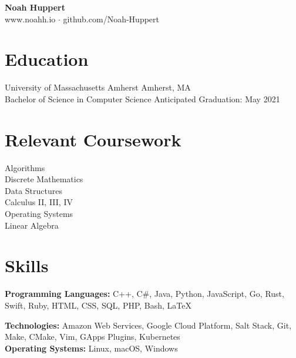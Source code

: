 \documentclass[10pt]{article}
\begin{document}

\centering
	\textbf{Noah Huppert} \\
	
	www.noahh.io $\cdot$ github.com/Noah-Huppert


\begin{flushleft}

\section{Education}
	University of Massachusetts Amherst \hfill Amherst, MA \\
	Bachelor of Science in Computer Science \hfill Anticipated Graduation: May 2021 \\

\section{Relevant Coursework}
	\begin{addmargin}[1em]{1em}
	\begin{multicols}{3}
		Algorithms \\
		Discrete Mathematics \\

		Data Structures \\
		Calculus II, III, IV \\

		Operating Systems \\
		Linear Algebra 
	\end{multicols} 
	\end{addmargin}


\section{Skills}
	\textbf{Programming Languages:} C++, C\#, Java, Python, JavaScript, Go, Rust, Swift, Ruby, HTML, CSS, SQL, PHP,
		Bash, LaTeX

	\textbf{Technologies:} Amazon Web Services, Google Cloud Platform, Salt Stack, Git, Make, CMake, Vim,
		GApps Plugins, Kubernetes \\

	\textbf{Operating Systems:} Linux, macOS, Windows


\end{flushleft}
\end{document}
